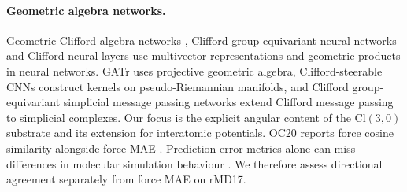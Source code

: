 \paragraph{Geometric algebra networks.}
Geometric Clifford algebra networks \cite{ruhe2023gcan}, Clifford group equivariant neural networks \cite{ruhe2023cgenn} and Clifford neural layers \cite{brandstetter2022clifford} use multivector representations and geometric products in neural networks. GATr \cite{brehmer2023geometric} uses projective geometric algebra, Clifford-steerable CNNs \cite{zhdanov2024clifford} construct kernels on pseudo-Riemannian manifolds, and Clifford group-equivariant simplicial message passing networks \cite{liu2024csmpn} extend Clifford message passing to simplicial complexes. Our focus is the explicit angular content of the $\mathrm{Cl}(3,0)$ substrate and its extension for interatomic potentials. OC20 reports force cosine similarity alongside force MAE \cite{chanussot2021oc20}. Prediction-error metrics alone can miss differences in molecular simulation behaviour \cite{kovacs2023mace}. We therefore assess directional agreement separately from force MAE on rMD17.
